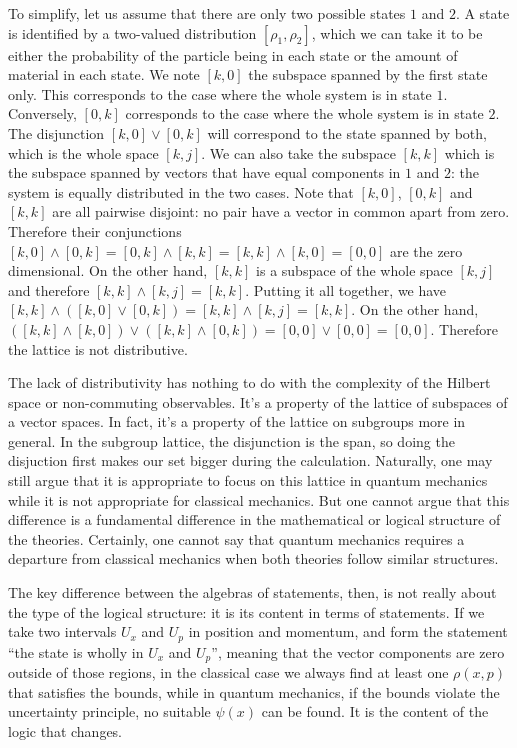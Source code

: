 \documentclass[10pt,twocolumn, nofootinbib]{revtex4-1}
\begin{document}
To simplify, let us assume that there are only two possible states $1$ and $2$. A state is identified by a two-valued distribution $[\rho_1, \rho_2]$, which we can take it to be either the probability of the particle being in each state or the amount of material in each state. We note $[k,0]$ the subspace spanned by the first state only. This corresponds to the case where the whole system is in state $1$. Conversely, $[0,k]$ corresponds to the case where the whole system is in state $2$. The disjunction $[k,0] \vee [0,k]$ will correspond to the state spanned by both, which is the whole space $[k,j]$. We can also take the subspace $[k,k]$ which is the subspace spanned by vectors that have equal components in $1$ and $2$: the system is equally distributed in the two cases. Note that $[k,0]$, $[0,k]$ and $[k,k]$ are all pairwise disjoint: no pair have a vector in common apart from zero. Therefore their conjunctions $[k,0] \wedge [0,k] = [0,k] \wedge [k,k] = [k,k] \wedge [k,0] = [0,0]$ are the zero dimensional. On the other hand, $[k,k]$ is a subspace of the whole space $[k,j]$ and therefore $[k,k] \wedge [k,j] = [k,k]$. Putting it all together, we have $[k,k] \wedge ( [k,0] \vee [0,k] ) = [k,k] \wedge [k,j] = [k,k]$. On the other hand, $( [k,k] \wedge [k,0] ) \vee ( [k,k] \wedge [0,k] ) = [0,0] \vee [0,0] = [0,0]$. Therefore the lattice is not distributive.

The lack of distributivity has nothing to do with the complexity of the Hilbert space or non-commuting observables. It's a property of the lattice of subspaces of a vector spaces. In fact, it's a property of the lattice on subgroups more in general. In the subgroup lattice, the disjunction is the span, so doing the disjuction first makes our set bigger during the calculation. Naturally, one may still argue that it is appropriate to focus on this lattice in quantum mechanics while it is not appropriate for classical mechanics. But one cannot argue that this difference is a fundamental difference in the mathematical or logical structure of the theories. Certainly, one cannot say that quantum mechanics requires a departure from classical mechanics when both theories follow similar structures.

The key difference between the algebras of statements, then, is not really about the type of the logical structure: it is its content in terms of statements. If we take two intervals $U_x$ and $U_p$ in position and momentum, and form the statement ``the state is wholly in $U_x$ and $U_p$'', meaning that the vector components are zero outside of those regions, in the classical case we always find at least one $\rho(x,p)$ that satisfies the bounds, while in quantum mechanics, if the bounds violate the uncertainty principle, no suitable $\psi(x)$ can be found. It is the content of the logic that changes. 
\end{document}
